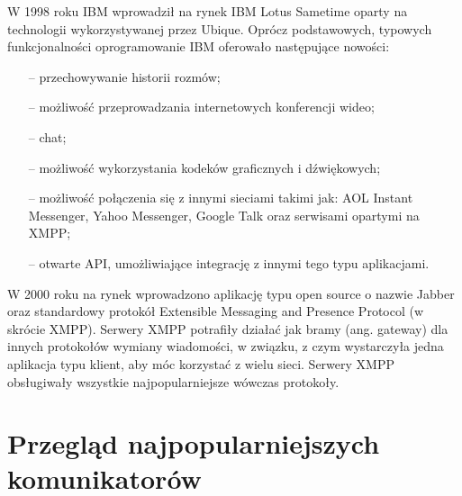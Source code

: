 \documentclass[a4paper,12pt]{article}
\begin{document}
\par W 1998 roku IBM wprowadził na rynek IBM Lotus Sametime oparty na technologii wykorzystywanej przez Ubique. Oprócz podstawowych, typowych funkcjonalności oprogramowanie IBM oferowało następujące nowości:
\begin{itemize}
    \item[--] przechowywanie historii rozmów;
    \item[--] możliwość przeprowadzania internetowych konferencji wideo;
    \item[--] chat;
    \item[--] możliwość wykorzystania kodeków graficznych i dźwiękowych;
    \item[--] możliwość połączenia się z innymi sieciami takimi jak: AOL Instant Messenger, Yahoo Messenger, Google Talk oraz serwisami opartymi na XMPP;
    \item[--] otwarte API, umożliwiające integrację z innymi tego typu aplikacjami.
\end{itemize} 

W 2000 roku na rynek wprowadzono aplikację typu open source o nazwie Jabber oraz standardowy protokół Extensible Messaging and Presence Protocol (w skrócie XMPP). Serwery XMPP potrafiły działać jak bramy (ang. gateway) dla innych protokołów wymiany wiadomości, w związku, z czym wystarczyła jedna aplikacja typu klient, aby móc korzystać z wielu sieci. Serwery XMPP obsługiwały wszystkie najpopularniejsze wówczas protokoły.


















  
\section[Przegląd najpopularniejszych komunikatorów]{Przegląd najpopularniejszych komunikatorów}
\end{document}
